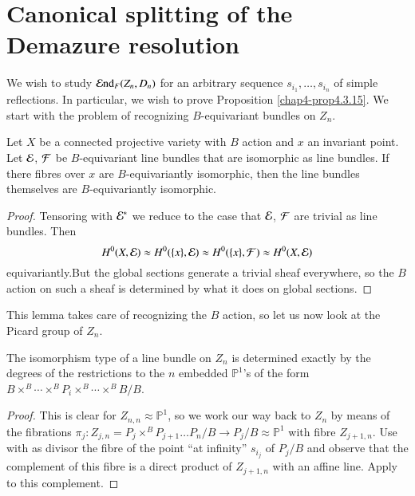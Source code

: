 \section{Canonical splitting of the Demazure
  resolution}\label{sec-A.4}

We wish to study $\operatorname{\mathcal{E}nd}_{F}(Z_{n},D_{n})$ for an arbitrary sequence
$s_{i_{1}},\ldots,s_{i_{n}}$ of simple reflections. In particular, we
wish to prove Proposition \ref{chap4-prop4.3.15}. We start with the
problem of recognizing $B$-equivariant bundles on $Z_{n}$.

\begin{lemma}\label{lem-A.4.1}
Let $X$ be a connected projective variety with $B$ action and $x$ an
invariant point. Let $\mathcal{E}$, $\mathcal{F}$ be $B$-equivariant line bundles that
are isomorphic as line bundles. If there fibres over $x$ are
$B$-equivariantly isomorphic, then the line bundles themselves are
$B$-equivariantly isomorphic.
\end{lemma}

\begin{proof}
Tensoring with $\mathcal{E}^{*}$ we reduce to the case that $\mathcal{E}$, $\mathcal{F}$ are
trivial as line bundles. Then
$$
H^{0}(X,\mathcal{E})\approx H^{0}(\{x\},\mathcal{E})\approx H^{0}(\{x\},\mathcal{F})\approx
H^{0}(X,\mathcal{E})
$$
equivariantly.\pageoriginale But\label{page85} the global sections generate a
trivial sheaf everywhere, so the $B$ action on such a sheaf is
determined by what it does on global sections.
\end{proof}

This lemma takes care of recognizing the $B$ action, so let us now
look at the Picard group of $Z_{n}$.

\begin{lemma}\label{lem-A.4.2}
The isomorphism type of a line bundle on $Z_{n}$ is determined exactly
by the degrees of the restrictions to the $n$ embedded
$\mathbb{P}^{1}$'s of the form
$B\times^{B}\cdots\times^{B}P_{i}\times^{B}\cdots\times^{B}B/B$. 
\end{lemma}

\begin{proof}
This is clear for $Z_{n,n}\approx \mathbb{P}^{1}$, so we work our way
back to $Z_{n}$ by means of the fibrations
$\pi_{j}:Z_{j,n}=P_{j}\times^{B}P_{j+1}\ldots P_{n}/B\to
P_{j}/B\approx \mathbb{P}^{1}$ with fibre $Z_{j+1,n}$. Use
\cite[Ch.\@ II, Prop.\@ 6.5]{key7} with as divisor the fibre of the
point ``at infinity'' $s_{i_{j}}$ of $P_{j}/B$ and observe that the
complement of this fibre is a direct product of $Z_{j+1,n}$ with an
affine line. Apply \cite[Ch.\@ II, Prop.\@ 6.6]{key7} to this complement.
\end{proof}

